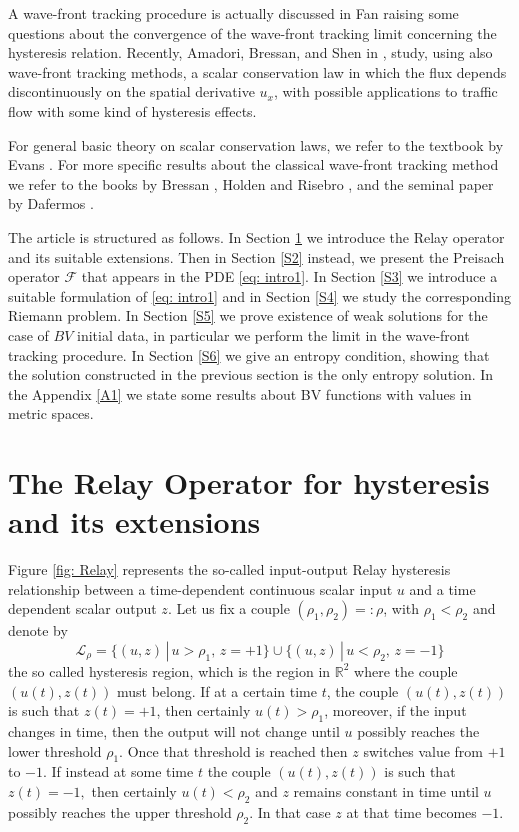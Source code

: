 \documentclass[12pt]{article}
\newcommand{\R}{\mathbb{R}}
\newcommand{\F}{\mathcal{F}}
\newcommand{\LL}{\mathcal{L}}
\newcommand{\p}{\rho}
\newcommand{\1}{\mathds{1}}
\theoremstyle{definition}
\begin{document}
A wave-front tracking procedure is actually discussed in Fan \cite{F1} raising some questions about the convergence of the wave-front tracking limit concerning the hysteresis relation. Recently, Amadori, Bressan, and Shen in \cite{ADBA1}, \cite{ADBA2} study, using also wave-front tracking methods, a scalar conservation law in which the flux depends discontinuously on the spatial derivative $u_x$, with possible applications to  traffic flow with some kind of hysteresis effects.

For general basic theory on scalar conservation laws, we refer to the textbook by Evans \cite{EV}. For more specific results about the classical wave-front tracking method we refer to the books by Bressan \cite{AB3}, Holden and Risebro \cite{HH}, and the seminal paper by Dafermos \cite{DCP}.

The article is structured as follows. In Section \ref{S1} we introduce the Relay operator and its suitable extensions. Then in Section \ref{S2} instead, we present the Preisach operator $\F$ that appears in the PDE \eqref{eq: intro1}. In Section \ref{S3} we introduce a suitable formulation of \eqref{eq: intro1} and in Section \ref{S4} we study the corresponding Riemann problem. In Section \ref{S5} we prove existence of weak solutions for the case of $BV$ initial data, in particular we perform the limit in the wave-front tracking procedure. In Section \ref{S6} we give an entropy condition, showing that the solution constructed in the previous section is the only entropy solution. In the Appendix \ref{A1} we state some results about BV functions with values in metric spaces. 





\section{The Relay Operator for hysteresis and its extensions}\label{S1}

Figure \ref{fig: Relay} represents the so-called input-output Relay hysteresis relationship between a time-dependent continuous scalar input $u$ and a time dependent scalar output $z.$ Let us fix a couple $(\p_1,\p_2)=:\p$, with $\p_1<\p_2$ and denote by \begin{equation}\label{eq: Lrho}
\LL_\p=\{ (u,z)\,|\,u > \p_1,\, z= +1\} \cup \{(u,z)\,|\, u < \p_2,\, z= -1\} 
\end{equation}
the so called hysteresis region, which is the region in $\R^2$ where the couple $(u(t),z(t))$ must belong. If at a certain time $t$, the couple $(u(t),z(t))$ is such that $z(t)=+1$, then certainly $u(t) > \p_1$, moreover, if the input changes in time, then the output will not change until $u$ possibly reaches the lower threshold $\p_1$. Once that threshold is reached then $z$ switches value from $+1$ to $-1$. If instead at some time $t$ the couple $(u(t),z(t))$ is such that $z(t)=-1,$ then certainly $u(t)<\rho_2$ and $z$ remains constant in time until $u$ possibly reaches the upper threshold $\p_2$. In that case $z$ at that time becomes $-1$.
\par 
\end{document}
